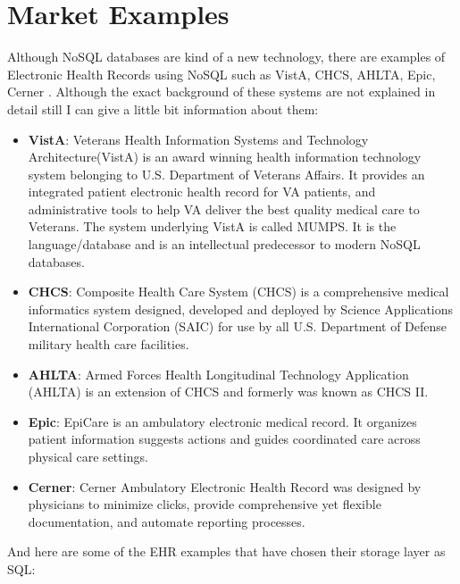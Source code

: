 \documentclass{article}
\begin{document}
\section{Market Examples}
Although NoSQL databases are kind of a new technology, there are examples of Electronic Health Records using NoSQL such as VistA, CHCS, AHLTA, Epic, Cerner \cite{online4}. Although the exact background of these systems are not explained in detail still I can give a little bit information about them:
\begin{itemize}
	\item \textbf{VistA}: Veterans Health Information Systems and Technology Architecture(VistA) is an award winning health information technology system belonging to U.S. Department of Veterans Affairs. It provides an integrated patient electronic health record for VA patients, and administrative tools to help VA deliver the best quality medical care to Veterans\cite{online8}. The system underlying VistA is called MUMPS. It is the language/database and is an intellectual predecessor to modern NoSQL databases\cite{online7}.
	\item \textbf{CHCS}: Composite Health Care System (CHCS) is a comprehensive medical informatics system designed, developed and deployed by Science Applications International Corporation (SAIC) for use by all U.S. Department of Defense military health care facilities\cite{online9}.
	\item \textbf{AHLTA}: Armed Forces Health Longitudinal Technology Application (AHLTA) is an extension of CHCS and formerly was known as CHCS II\cite{online10}. 
	\item \textbf{Epic}: EpiCare is an ambulatory electronic medical record. It organizes patient information suggests actions and guides coordinated care across physical care settings\cite{online11}.
	\item \textbf{Cerner}: Cerner Ambulatory Electronic Health Record was designed by physicians to minimize clicks, provide comprehensive yet flexible documentation, and automate reporting processes\cite{online12}.
\end{itemize}

And here are some of the EHR examples that have chosen their storage layer as SQL:
\end{document}
